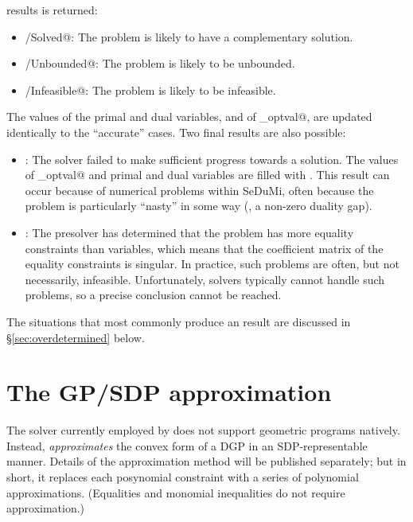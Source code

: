 \documentclass[12pt]{article}
\begin{document}
results is returned:
\begin{itemize}
	\item \verb@Inaccurate/Solved@: The problem is likely to have a complementary solution.
	\item \verb@Inaccurate/Unbounded@: The problem is likely to be unbounded.
	\item \verb@Inaccurate/Infeasible@: The problem is likely to be infeasible.
\end{itemize}
The values of the primal and dual variables, and of \verb@cvx_optval@, are updated
identically to the ``accurate'' cases. Two final results are also possible:
\begin{itemize}
	\item \verb@Failed@: The solver failed to make sufficient progress towards
	      a solution. The values of \verb@cvx_optval@ and primal and dual
	      variables are filled with \verb@NaN@s. This result can occur because
	      of numerical problems within SeDuMi, often because the problem
	      is particularly ``nasty'' in some way (\eg, a non-zero duality gap).
	\item \verb@Overdetermined@: The presolver has determined that the problem
	      has more equality constraints than variables, which means that the coefficient
	      matrix of the equality constraints is singular. In practice, such problems are
	      often, but not necessarily, infeasible. Unfortunately, solvers 
	      typically cannot handle such problems, so a precise conclusion
	      cannot be reached.
\end{itemize}
The situations that most commonly produce an \verb@Overdetermined@ result are discussed
in \S\ref{sec:overdetermined} below.

\section{The GP/SDP approximation}
\label{sec:gp-approx}

The solver currently employed by \cvx does not support geometric programs natively.
Instead, \cvx \emph{approximates} the convex form of a DGP in an SDP-representable
manner. Details of the approximation method will be published separately; but in short,
it replaces each posynomial constraint with a series of polynomial
approximations. (Equalities and monomial inequalities do not require approximation.)
\end{document}
